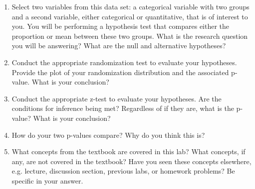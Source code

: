 \documentclass[11pt]{article}
\begin{document}
\begin{enumerate}
\item Select two variables from this data set: a categorical variable with two groups and a second variable, either categorical or quantitative, that is of interest to you.  You will be performing a hypothesis test that compares either the proportion or mean between these two groups.  What is the research question you will be answering?  What are the null and alternative hypotheses?

\item Conduct the appropriate randomization test to evaluate your hypotheses.  Provide the plot of your randomization distribution and the associated p-value.  What is your conclusion?

\item Conduct the appropriate z-test to evaluate your hypotheses.  Are the conditions for inference being met?  Regardless of if they are, what is the p-value?  What is your conclusion?

\item How do your two p-values compare?  Why do you think this is? 

\item What concepts from the textbook are covered in this lab?  What concepts, if any, are not covered in the textbook?  Have you seen these concepts elsewhere, e.g. lecture, discussion section, previous labs, or homework problems?  Be specific in your answer.

\end{enumerate}
\end{document}
